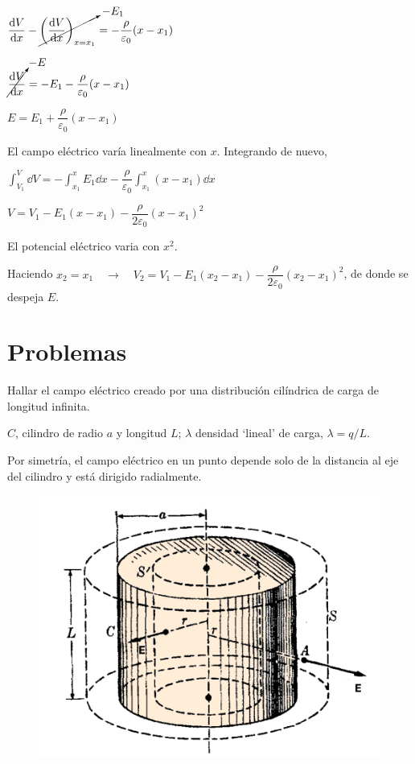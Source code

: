 $\displaystyle \dv{V}{x}-\cancelto{-E_1}{\left( \dv{V}{x} \right)_{x=x_1}}=-\dfrac \rho {\varepsilon_0} (x-x_1)$

$\displaystyle \cancelto{-E}{\dv{V}{x}}=-E_1-\dfrac \rho {\varepsilon_0} (x-x_1)$

$\displaystyle E=E_1+\dfrac \rho {\varepsilon_0} (x-x_1)$

El campo eléctrico varía linealmente con $x$. Integrando de nuevo,

$\displaystyle \int_{V_1}^V \dd V = -\int_{x_1}^x E_1 \dd x - \dfrac \rho {\varepsilon_0} \int_{x_1}^x (x-x_1) \dd x$

$V=V_1-E_1(x-x_1)-\dfrac \rho {2\varepsilon_0} (x-x_1)^2$

El potencial eléctrico varia con $x^2$.

Haciendo $x_2=x_1 \quad \to \quad V_2=V_1-E_1(x_2-x_1)-\dfrac \rho {2\varepsilon_0} (x_2-x_1)^2$, de donde se despeja $E$.





\section{Problemas}

\begin{prob}
Hallar el campo eléctrico creado por una distribución cilíndrica de carga de longitud infinita.	
\end{prob}

$C$, cilindro de radio $a$ y longitud $L$; $\lambda$ densidad `lineal' de carga, $\lambda=q/L$.

Por simetría, el campo eléctrico en un punto depende solo de la distancia al eje del cilindro y está dirigido radialmente.

\begin{figure}[H]
	\centering
	\includegraphics[width=.85\textwidth]{imagenes/imagenes23/T23IM14.png}
\end{figure}



